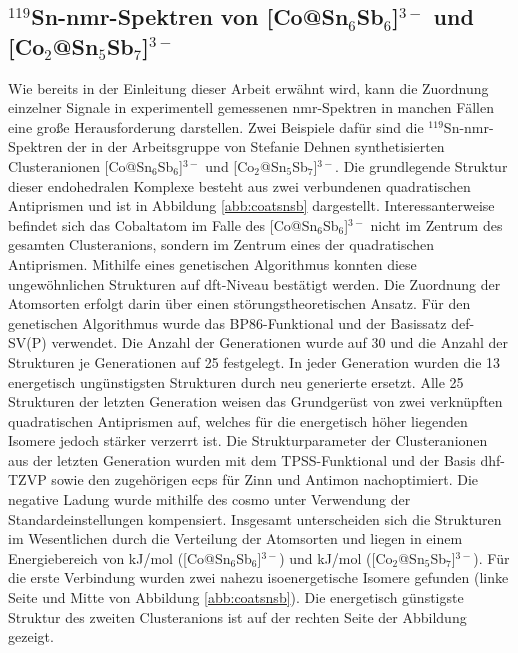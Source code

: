 \subsection{\texorpdfstring{$^{119}$Sn-\acs{nmr}-Spektren von [Co@Sn$_6$Sb$_6$]$^{3-}$ und [Co$_2$@Sn$_5$Sb$_7$]$^{3-}$}{119Sn-NMR Spektren von [Co at Sn\_6Sb\_6]3- und [Co\_2 at Sn\_5Sb\_7]3-}}
Wie bereits in der Einleitung dieser Arbeit erwähnt wird, kann die Zuordnung einzelner Signale in experimentell gemessenen \ac{nmr}-Spektren in manchen Fällen eine große Herausforderung darstellen. Zwei Beispiele dafür sind die $^{119}$Sn-\ac{nmr}-Spektren der in der Arbeitsgruppe von Stefanie Dehnen synthetisierten Clusteranionen [Co@Sn$_6$Sb$_6$]$^{3-}$ und [Co$_2$@Sn$_5$Sb$_7$]$^{3-}$.\supercite{wilson2018structure} Die grundlegende Struktur dieser endohedralen Komplexe besteht aus zwei verbundenen quadratischen Antiprismen und ist in Abbildung \ref{abb:coatsnsb} dargestellt. Interessanterweise befindet sich das Cobaltatom im Falle des [Co@Sn$_6$Sb$_6$]$^{3-}$ nicht im Zentrum des gesamten Clusteranions, sondern im Zentrum eines der quadratischen Antiprismen. Mithilfe eines genetischen Algorithmus\supercite{weigend2014extending} konnten diese ungewöhnlichen Strukturen auf \ac{dft}-Niveau bestätigt werden. Die Zuordnung der Atomsorten erfolgt darin über einen störungstheoretischen Ansatz. Für den genetischen Algorithmus wurde das BP86-Funktional\supercite{perdew1986density,becke1988density} und der Basissatz def-SV(P)\supercite{eichkorn1997auxiliary} verwendet. Die Anzahl der Generationen wurde auf 30 und die Anzahl der Strukturen je Generationen auf 25 festgelegt. In jeder Generation wurden die 13 energetisch ungünstigsten Strukturen durch neu generierte ersetzt. Alle 25 Strukturen der letzten Generation weisen das Grundgerüst von zwei verknüpften quadratischen Antiprismen auf, welches für die energetisch höher liegenden Isomere jedoch stärker verzerrt ist. Die Strukturparameter der Clusteranionen aus der letzten Generation wurden  mit dem TPSS-Funktional\supercite{tao2003climbing} und der Basis dhf-TZVP\supercite{weigend2010segmented} sowie den zugehörigen \acp{ecp}\supercite{metz2000small} für Zinn und Antimon nachoptimiert. Die negative Ladung wurde mithilfe des \ac{cosmo}\supercite{klamt1993cosmo} unter Verwendung der Standardeinstellungen kompensiert. Insgesamt unterscheiden sich die Strukturen im Wesentlichen durch die Verteilung der Atomsorten und liegen in einem Energiebereich von \unit[37]{kJ/mol} ([Co@Sn$_6$Sb$_6$]$^{3-}$) und \unit[22]{kJ/mol} ([Co$_2$@Sn$_5$Sb$_7$]$^{3-}$). Für die erste Verbindung wurden zwei nahezu isoenergetische Isomere gefunden (linke Seite und Mitte von Abbildung \ref{abb:coatsnsb}). Die energetisch günstigste Struktur des zweiten Clusteranions ist auf der rechten Seite der Abbildung gezeigt.

